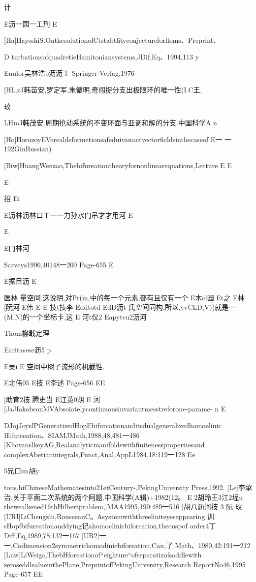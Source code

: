 计

E沥一园一工刑
E

[Ha]HaysshiS.OnthesolutionofCtstabtlityconjectureforfloms、Preprint、

D
turbationsofquadretieHamitoniansystems,JDif,Eq、1994,113
y

Euulor吴林浩b沥沥工
Springer-Verlag,1976

[HL.zJ韩苗安,罗定军,朱循明,奇闯捉分支出极限环的唯一性(I.C王,

玟

LHmJ韩茂安.周期抢动系统的不变环面与亚调和解的分支.中国科学A
n

[Ho]HorozoyEVerealdeformetionsafeduivanantvectorficldsinthecaseof
E一
一192GinRussian)

[Biw]HuangWenzao,Thebifureationtheoryfornonlinearequations,Lecture
E
E

E

招
Ei

E沥林沥林口工一一力孙水门吊才才用河
E

E

E门林河

Sarveys1990,40148一200
Page-655
E

E振目沥
E

医林
量空间.这说明,对Pr(m,中的每一个元素,都有且仅有一个
E木cl园
Et之
E林
[阮河
E伟
E
E
技t技李
Eddtotd
EdD沥t
氏空间同构,所以,yvCLD,V))就是一(M,N)的一个坐标卡,这
E
河t仪2
Eapyteu2沥河

Thom槲戢定理

Earitasese沥5
p

E吴i
E
空间中树子流形的机截性.

E北伟05
E技
E李述
Page-656
EE

[助育2技
腾史当
E江英0胡
E
河
[JaJIakobsonMVAbsoiatelycontinuousinvariantmesstreforone-parame-
n
E

DJojJoyslPGeneratizedHopEbifurcationanditsdualgeneralizedhomoelinic
Hifurceation、SIAMJMath,1988,48,481一486
]KhovanslkeyAG,Realanalyticmanifoldswithfinitenesspropertiesand
complexAbetianintegrals,Funct,Anal,AppL1984,18:119一128
Ee

5兄口un胡y

tons,hiChineseMathematesinto21etCentury-,PekingUniversity
Press,1992.
[Le]李承治.关于平面二次系统的两个阿题.中国科学(A辑)+1982(12。
E
2胡玲王3江2埕u
thewealkened16thHilbertprablem,]MAA1995,190:489一516
[胡八沥河技
3
阮
玟
[URI]LiChengzhi,RouseeauC。Asystemwiththreeliniteyeseppearing
训sHopfbifureationanddying记ahomoclinicbiforcation,thecuspof
order4丁Diff,Eq,1989,78:132一167
[UR2]一一,Codimension2symmetrichomodiniebiforeation,Can,了
Math、1980,42:191一212
[Lnw]LiWeiga,ThebHforeationof“eighture“ofseparatizofsaddlewith
zeroseddlealueinthePlane,PreprintofPekingUniversity,Research
ReportNo46,1995
Page-657
EE

